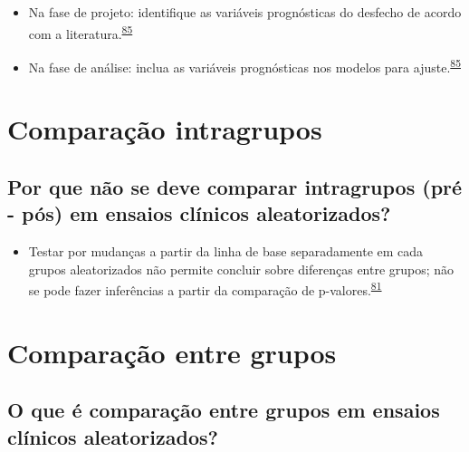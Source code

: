 \documentclass[
]{book}
\providecommand{\tightlist}{%
  \setlength{\itemsep}{0pt}\setlength{\parskip}{0pt}}
\begin{document}
\begin{itemize}
\item
  Na fase de projeto: identifique as variáveis prognósticas do desfecho de acordo com a literatura.\textsuperscript{\protect\hyperlink{ref-roberts1999}{85}}
\item
  Na fase de análise: inclua as variáveis prognósticas nos modelos para ajuste.\textsuperscript{\protect\hyperlink{ref-roberts1999}{85}}
\end{itemize}

\hypertarget{comparacao-intragrupos}{%
\section{Comparação intragrupos}\label{comparacao-intragrupos}}

\hypertarget{por-que-nuxe3o-se-deve-comparar-intragrupos-pruxe9---puxf3s-em-ensaios-cluxednicos-aleatorizados}{%
\subsection{Por que não se deve comparar intragrupos (pré - pós) em ensaios clínicos aleatorizados?}\label{por-que-nuxe3o-se-deve-comparar-intragrupos-pruxe9---puxf3s-em-ensaios-cluxednicos-aleatorizados}}

\begin{itemize}
\tightlist
\item
  Testar por mudanças a partir da linha de base separadamente em cada grupos aleatorizados não permite concluir sobre diferenças entre grupos; não se pode fazer inferências a partir da comparação de p-valores.\textsuperscript{\protect\hyperlink{ref-bland2011}{81}}
\end{itemize}

\hypertarget{comparacao-entre-grupos}{%
\section{Comparação entre grupos}\label{comparacao-entre-grupos}}

\hypertarget{o-que-uxe9-comparauxe7uxe3o-entre-grupos-em-ensaios-cluxednicos-aleatorizados}{%
\subsection{O que é comparação entre grupos em ensaios clínicos aleatorizados?}\label{o-que-uxe9-comparauxe7uxe3o-entre-grupos-em-ensaios-cluxednicos-aleatorizados}}
\end{document}
